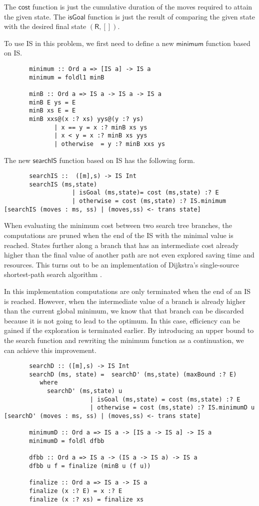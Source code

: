 \documentclass[journal,onecolumn,12pt]{IEEEtran}
\begin{document}
The $\mathsf{cost}$ function is just the cumulative duration of the moves required to attain the given state. The $\mathsf{isGoal}$ function is just the result of comparing the given state with the desired final state $\mathsf{(R,[])}$.

To use IS in this problem, we first need to define a new $\mathsf{minimum}$ function based on IS.
\begin{lstlisting}
       minimum :: Ord a => [IS a] -> IS a
       minimum = foldl1 minB

       minB :: Ord a => IS a -> IS a -> IS a
       minB E ys = E
       minB xs E = E
       minB xxs@(x :? xs) yys@(y :? ys)
              | x == y = x :? minB xs ys
              | x < y = x :? minB xs yys
              | otherwise  = y :? minB xxs ys
\end{lstlisting}

The new $\mathsf{searchIS}$ function based on IS has the following form.
\begin{lstlisting} 
       searchIS ::  ([m],s) -> IS Int
       searchIS (ms,state)
                   | isGoal (ms,state)= cost (ms,state) :? E
                   | otherwise = cost (ms,state) :? IS.minimum [searchIS (moves : ms, ss) | (moves,ss) <- trans state]
\end{lstlisting}

When evaluating the minimum cost between two search tree branches, the computations are pruned when the end of the IS with the minimal value is reached.  States further along a branch that has an intermediate cost already higher than the final value of another path are not even explored saving time and resources.  This turns out to be an implementation of Dijkstra’s single-source shortest-path
search algorithm \cite{dijkstra}.

In this implementation computations are only terminated when the end of an IS is reached.  However, when the intermediate value of a branch is already higher than the current global minimum, we know that that branch can be discarded because it is not going to lead to the optimum.  In this case, efficiency can be gained if the exploration is terminated earlier.  By introducing an upper bound to the search function and rewriting the minimum function as a continuation, we can achieve this improvement.
\begin{lstlisting}
       searchD :: ([m],s) -> IS Int
       searchD (ms, state) =  searchD' (ms,state) (maxBound :? E)
          where
            searchD' (ms,state) u
                        | isGoal (ms,state) = cost (ms,state) :? E
                        | otherwise = cost (ms,state) :? IS.minimumD u [searchD' (moves : ms, ss) | (moves,ss) <- trans state]

       minimumD :: Ord a => IS a -> [IS a -> IS a] -> IS a
       minimumD = foldl dfbb
       
       dfbb :: Ord a => IS a -> (IS a -> IS a) -> IS a
       dfbb u f = finalize (minB u (f u))

       finalize :: Ord a => IS a -> IS a
       finalize (x :? E) = x :? E
       finalize (x :? xs) = finalize xs
\end{lstlisting}
\end{document}
